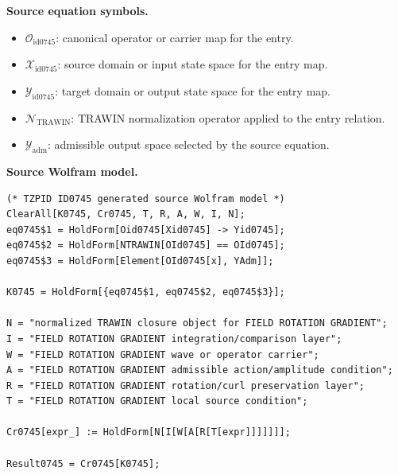 \begin{minipage}[t]{0.49\linewidth}
\begingroup
\small
\raggedright
\textbf{Source equation symbols.}\par
\begin{itemize}[leftmargin=1.35em,itemsep=1pt,topsep=1pt,parsep=0pt]
    \item $\mathcal{O}_{\mathrm{id0745}}$: canonical operator or carrier map for the entry.
    \item $\mathcal{X}_{\mathrm{id0745}}$: source domain or input state space for the entry map.
    \item $\mathcal{Y}_{\mathrm{id0745}}$: target domain or output state space for the entry map.
    \item $\mathcal{N}_{\mathrm{TRAWIN}}$: TRAWIN normalization operator applied to the entry relation.
    \item $\mathcal{Y}_{\mathrm{adm}}$: admissible output space selected by the source equation.
\end{itemize}
\endgroup
\end{minipage}\hfill
\begin{minipage}[t]{0.47\linewidth}
\begingroup
\scriptsize
\raggedright
\textbf{Source Wolfram model.}\par
\begin{Verbatim}[fontsize=\tiny,breaklines=true,breakanywhere=true]
(* TZPID ID0745 generated source Wolfram model *)
ClearAll[K0745, Cr0745, T, R, A, W, I, N];
eq0745$1 = HoldForm[Oid0745[Xid0745] -> Yid0745];
eq0745$2 = HoldForm[NTRAWIN[OId0745] == OId0745];
eq0745$3 = HoldForm[Element[OId0745[x], YAdm]];

K0745 = HoldForm[{eq0745$1, eq0745$2, eq0745$3}];

N = "normalized TRAWIN closure object for FIELD ROTATION GRADIENT";
I = "FIELD ROTATION GRADIENT integration/comparison layer";
W = "FIELD ROTATION GRADIENT wave or operator carrier";
A = "FIELD ROTATION GRADIENT admissible action/amplitude condition";
R = "FIELD ROTATION GRADIENT rotation/curl preservation layer";
T = "FIELD ROTATION GRADIENT local source condition";

Cr0745[expr_] := HoldForm[N[I[W[A[R[T[expr]]]]]]];

Result0745 = Cr0745[K0745];
\end{Verbatim}
\endgroup
\end{minipage}

